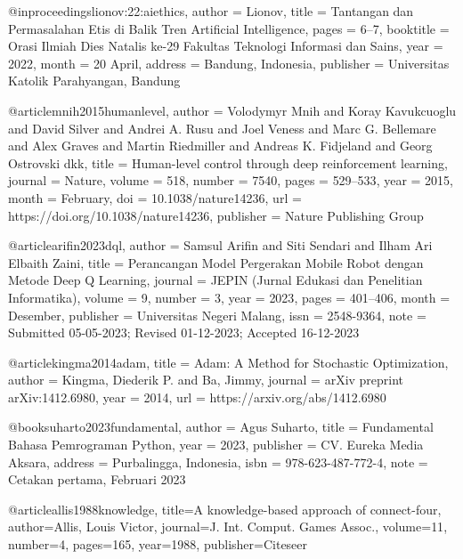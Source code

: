 @inproceedings{lionov:22:aiethics,
	author    	= {Lionov},
	title     	= {Tantangan dan Permasalahan Etis di Balik Tren Artificial Intelligence},
	pages     	= {6--7}, 	
	booktitle 	= {Orasi Ilmiah Dies Natalis ke-29 Fakultas Teknologi Informasi dan Sains},	
	year      	= {2022},
	month		= {20 April},
	address		= {Bandung, Indonesia},
	publisher	= {Universitas Katolik Parahyangan, Bandung}
}

@article{mnih2015humanlevel,
  author    = {Volodymyr Mnih and Koray Kavukcuoglu and David Silver and Andrei A. Rusu and Joel Veness and Marc G. Bellemare and Alex Graves and Martin Riedmiller and Andreas K. Fidjeland and Georg Ostrovski dkk},
  title     = {Human-level control through deep reinforcement learning},
  journal   = {Nature},
  volume    = {518},
  number    = {7540},
  pages     = {529--533},
  year      = {2015},
  month     = {February},
  doi       = {10.1038/nature14236},
  url       = {https://doi.org/10.1038/nature14236},
  publisher = {Nature Publishing Group}
}

@article{arifin2023dql,
  author    = {Samsul Arifin and Siti Sendari and Ilham Ari Elbaith Zaini},
  title     = {Perancangan Model Pergerakan Mobile Robot dengan Metode Deep Q Learning},
  journal   = {JEPIN (Jurnal Edukasi dan Penelitian Informatika)},
  volume    = {9},
  number    = {3},
  year      = {2023},
  pages     = {401--406},
  month     = {Desember},
  publisher = {Universitas Negeri Malang},
  issn      = {2548-9364},
  note      = {Submitted 05-05-2023; Revised 01-12-2023; Accepted 16-12-2023}
}

@article{kingma2014adam,
  title     = {Adam: A Method for Stochastic Optimization},
  author    = {Kingma, Diederik P. and Ba, Jimmy},
  journal   = {arXiv preprint arXiv:1412.6980},
  year      = {2014},
  url       = {https://arxiv.org/abs/1412.6980}
}

@book{suharto2023fundamental,
  author    = {Agus Suharto},
  title     = {Fundamental Bahasa Pemrograman Python},
  year      = {2023},
  publisher = {CV. Eureka Media Aksara},
  address   = {Purbalingga, Indonesia},
  isbn      = {978-623-487-772-4},
  note      = {Cetakan pertama, Februari 2023}
}

@article{allis1988knowledge,
  title={A knowledge-based approach of connect-four},
  author={Allis, Louis Victor},
  journal={J. Int. Comput. Games Assoc.},
  volume={11},
  number={4},
  pages={165},
  year={1988},
  publisher={Citeseer}
}

